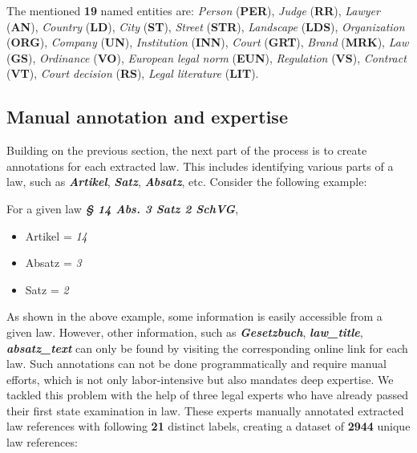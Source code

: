 \documentclass{IOS-Book-Article}
\begin{document}
The mentioned \textbf{19} named entities are:
\textit{Person} (\textbf{PER}), \textit{Judge} (\textbf{RR}), \textit{Lawyer} (\textbf{AN}), \textit{Country} (\textbf{LD}), \textit{City} (\textbf{ST}), \textit{Street} (\textbf{STR}), \textit{Landscape} (\textbf{LDS}), \textit{Organization} (\textbf{ORG}), \textit{Company} (\textbf{UN}), \textit{Institution} (\textbf{INN}), \textit{Court} (\textbf{GRT}), \textit{Brand} (\textbf{MRK}), \textit{Law} (\textbf{GS}), \textit{Ordinance} (\textbf{VO}), \textit{European legal norm} (\textbf{EUN}), \textit{Regulation} (\textbf{VS}), \textit{Contract} (\textbf{VT}), \textit{Court decision} (\textbf{RS}), \textit{Legal literature} (\textbf{LIT}).

\subsection{Manual annotation and expertise}

Building on the previous section, the next part of the process is to create annotations for each extracted law. This includes identifying various parts of a law, such as \textbf{\textit{Artikel}}, \textbf{\textit{Satz}}, \textbf{\textit{Absatz}}, etc. Consider the following example:

\begin{mdframed}
    For a given law \textbf{\textit{§ 14 Abs. 3 Satz 2 SchVG}},
    \begin{itemize}
        \item Artikel = \textit{14}
        \item Absatz = \textit{3}
        \item Satz = \textit{2}
    \end{itemize}
\end{mdframed}

As shown in the above example, some information is easily accessible from a given law. However, other information, such as \textbf{\textit{Gesetzbuch}}, \textbf{\textit{law\_title}}, \textbf{\textit{absatz\_text}} can only be found by visiting the corresponding online link for each law. Such annotations can not be done programmatically and require manual efforts, which is not only labor-intensive but also mandates deep expertise. We tackled this problem with the help of three legal experts who have already passed their first state examination in law. These experts manually annotated extracted law references with following \textbf{21} distinct labels, creating a dataset of \textbf{2944} unique law references:
\end{document}
